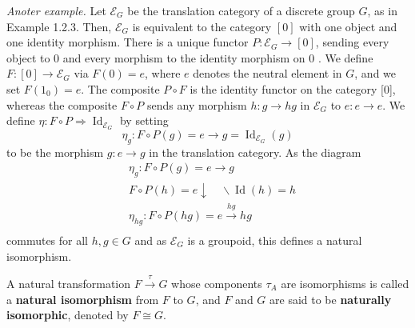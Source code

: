 \begin{example}
\textit{Anoter example.} Let $\mathcal{E}_G$ be the translation category of a discrete group $G$, as in Example 1.2.3. Then, $\mathcal{E}_G$ is equivalent to the category $[0]$ with one object and one identity morphism. There is a unique functor $P: \mathcal{E}_G \rightarrow[0]$, sending every object to 0 and every morphism to the identity morphism on 0 . We define $F:[0] \rightarrow \mathcal{E}_G$ via $F(0)=e$, where $e$ denotes the neutral element in $G$, and we set $F\left(1_0\right)=e$. The composite $P \circ F$ is the identity functor on the category [0], whereas the composite $F \circ P$ sends any morphism $h: g \rightarrow h g$ in $\mathcal{E}_G$ to $e: e \rightarrow e$.
We define $\eta: F \circ P \Rightarrow \operatorname{Id}_{\mathcal{E}_G}$ by setting
$$
\eta_g: F \circ P(g)=e \rightarrow g=\operatorname{Id}_{\mathcal{E}_G}(g)
$$
to be the morphism $g: e \rightarrow g$ in the translation category. As the diagram
$$
\begin{aligned}
& \eta_g: F \circ P(g)=e \longrightarrow g \\
& F \circ P(h)=e \downarrow \quad \backslash \operatorname{Id}(h)=h \\
& \eta_{h g}: F \circ P(h g)=e \xrightarrow{h g} h g \\
&
\end{aligned}
$$
commutes for all $h, g \in G$ and as $\mathcal{E}_G$ is a groupoid, this defines a natural isomorphism.
\end{example}

A natural transformation $F \xrightarrow{\tau} G$ whose components $\tau_A$ are isomorphisms is called a \textbf{natural isomorphism} from $F$ to $G$, and $F$ and $G$ are said to be \textbf{naturally isomorphic}, denoted by $F \cong G$.\\



